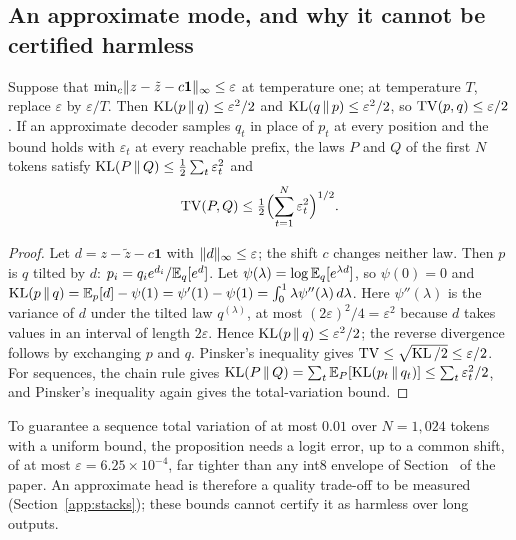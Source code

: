 \subsection{An approximate mode, and why it cannot be certified harmless}\label{app:approx}\label{sec:approx-mode}
\begin{proposition}\label{prop:kl}
Suppose that $\min_c\lVert z-\tilde z-c\mathbf 1\rVert_\infty\le\varepsilon$ at temperature one; at temperature $T$, replace $\varepsilon$ by $\varepsilon/T$. Then $\operatorname{KL}(p\,\|\,q)\le\varepsilon^2/2$ and $\operatorname{KL}(q\,\|\,p)\le\varepsilon^2/2$, so $\operatorname{TV}(p,q)\le\varepsilon/2$. If an approximate decoder samples $q_t$ in place of $p_t$ at every position and the bound holds with $\varepsilon_t$ at every reachable prefix, the laws $P$ and $Q$ of the first $N$ tokens satisfy $\operatorname{KL}(P\,\|\,Q)\le\tfrac12\sum_t\varepsilon_t^2$ and
\[\operatorname{TV}(P,Q)\le\tfrac12\Bigl(\sum_{t=1}^N\varepsilon_t^2\Bigr)^{1/2}.\]
\end{proposition}
\begin{proof}
Let $d=z-\tilde z-c\mathbf 1$ with $\lVert d\rVert_\infty\le\varepsilon$; the shift $c$ changes neither law. Then $p$ is $q$ tilted by $d$: $p_i=q_ie^{d_i}/\mathbb E_q[e^d]$. Let $\psi(\lambda)=\log\mathbb E_q[e^{\lambda d}]$, so $\psi(0)=0$ and $\operatorname{KL}(p\,\|\,q)=\mathbb E_p[d]-\psi(1)=\psi'(1)-\psi(1)=\int_0^1\lambda\psi''(\lambda)\,d\lambda$. Here $\psi''(\lambda)$ is the variance of $d$ under the tilted law $q^{(\lambda)}$, at most $(2\varepsilon)^2/4=\varepsilon^2$ because $d$ takes values in an interval of length $2\varepsilon$. Hence $\operatorname{KL}(p\,\|\,q)\le\varepsilon^2/2$; the reverse divergence follows by exchanging $p$ and $q$. Pinsker's inequality gives $\operatorname{TV}\le\sqrt{\operatorname{KL}/2}\le\varepsilon/2$. For sequences, the chain rule gives $\operatorname{KL}(P\,\|\,Q)=\sum_t\mathbb E_P[\operatorname{KL}(p_t\,\|\,q_t)]\le\sum_t\varepsilon_t^2/2$, and Pinsker's inequality again gives the total-variation bound.
\end{proof}
To guarantee a sequence total variation of at most $0.01$ over $N=1{,}024$ tokens with a uniform bound, the proposition needs a logit error, up to a common shift, of at most $\varepsilon=6.25\times10^{-4}$, far tighter than any int8 envelope of Section~ of the paper. An approximate head is therefore a quality trade-off to be measured (Section~\ref{app:stacks}); these bounds cannot certify it as harmless over long outputs.

